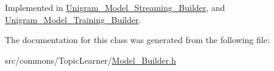 Implemented in \hyperlink{class_unigram___model___streaming___builder_a9afdd36c7ece8fa1ad87fa1b3f898d20}{Unigram\_\-Model\_\-Streaming\_\-Builder}, and \hyperlink{class_unigram___model___training___builder_a06bbd9a4b897a0357078f3279825409d}{Unigram\_\-Model\_\-Training\_\-Builder}.



The documentation for this class was generated from the following file:\begin{DoxyCompactItemize}
\item 
src/commons/TopicLearner/\hyperlink{_model___builder_8h}{Model\_\-Builder.h}\end{DoxyCompactItemize}
